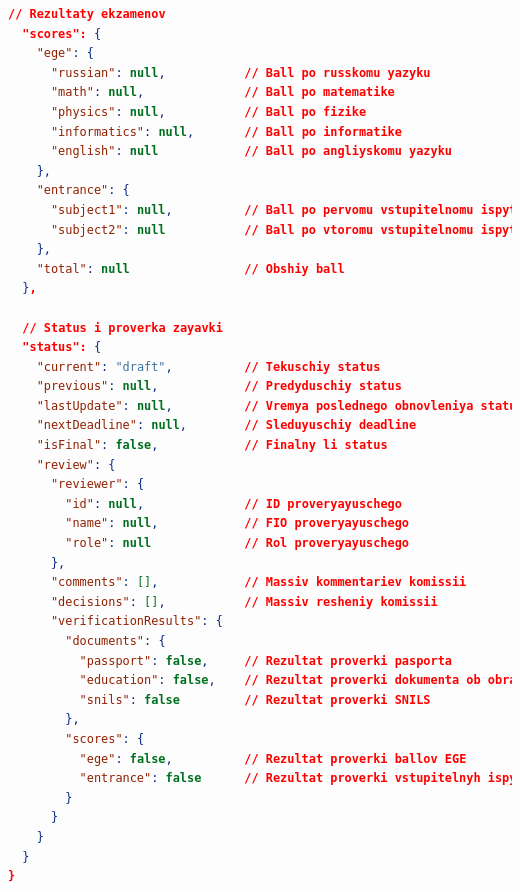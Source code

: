 \documentclass[areasetadvanced]{scrartcl}
\begin{document}
\begin{lstlisting}[language=json,caption={Bazovyi JSON format zayavki},label={lst:json-base}]
  // Rezultaty ekzamenov
  "scores": {
    "ege": {
      "russian": null,           // Ball po russkomu yazyku
      "math": null,              // Ball po matematike
      "physics": null,           // Ball po fizike
      "informatics": null,       // Ball po informatike
      "english": null            // Ball po angliyskomu yazyku
    },
    "entrance": {
      "subject1": null,          // Ball po pervomu vstupitelnomu ispytaniyu
      "subject2": null           // Ball po vtoromu vstupitelnomu ispytaniyu
    },
    "total": null                // Obshiy ball
  },

  // Status i proverka zayavki
  "status": {
    "current": "draft",          // Tekuschiy status
    "previous": null,            // Predyduschiy status
    "lastUpdate": null,          // Vremya poslednego obnovleniya statusa
    "nextDeadline": null,        // Sleduyuschiy deadline
    "isFinal": false,            // Finalny li status
    "review": {
      "reviewer": {
        "id": null,              // ID proveryayuschego
        "name": null,            // FIO proveryayuschego
        "role": null             // Rol proveryayuschego
      },
      "comments": [],            // Massiv kommentariev komissii
      "decisions": [],           // Massiv resheniy komissii
      "verificationResults": {
        "documents": {
          "passport": false,     // Rezultat proverki pasporta
          "education": false,    // Rezultat proverki dokumenta ob obrazovanii
          "snils": false         // Rezultat proverki SNILS
        },
        "scores": {
          "ege": false,          // Rezultat proverki ballov EGE
          "entrance": false      // Rezultat proverki vstupitelnyh ispytaniy
        }
      }
    }
  }
}
\end{lstlisting}
\newpage
\end{document}
